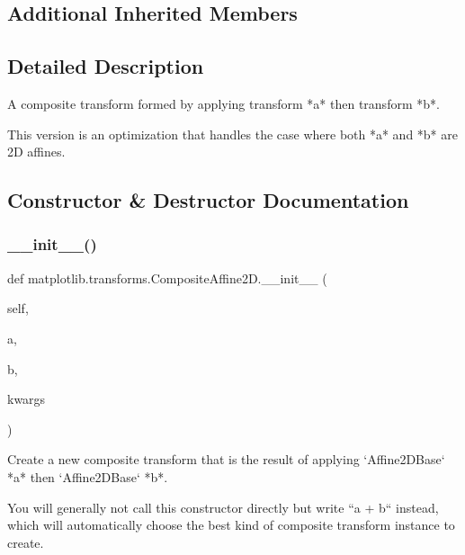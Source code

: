 \subsection*{Additional Inherited Members}


\subsection{Detailed Description}
\begin{DoxyVerb}A composite transform formed by applying transform *a* then transform *b*.

This version is an optimization that handles the case where both *a*
and *b* are 2D affines.
\end{DoxyVerb}
 

\subsection{Constructor \& Destructor Documentation}
\mbox{\label{classmatplotlib_1_1transforms_1_1CompositeAffine2D_a0ab5137c9be148dbe6c6399b85ab49ce}} 
\subsubsection{\texorpdfstring{\+\_\+\+\_\+init\+\_\+\+\_\+()}{\_\_init\_\_()}}
{\footnotesize\ttfamily def matplotlib.\+transforms.\+Composite\+Affine2\+D.\+\_\+\+\_\+init\+\_\+\+\_\+ (\begin{DoxyParamCaption}\item[{}]{self,  }\item[{}]{a,  }\item[{}]{b,  }\item[{}]{kwargs }\end{DoxyParamCaption})}

\begin{DoxyVerb}Create a new composite transform that is the result of
applying `Affine2DBase` *a* then `Affine2DBase` *b*.

You will generally not call this constructor directly but write ``a +
b`` instead, which will automatically choose the best kind of composite
transform instance to create.
\end{DoxyVerb}
 

